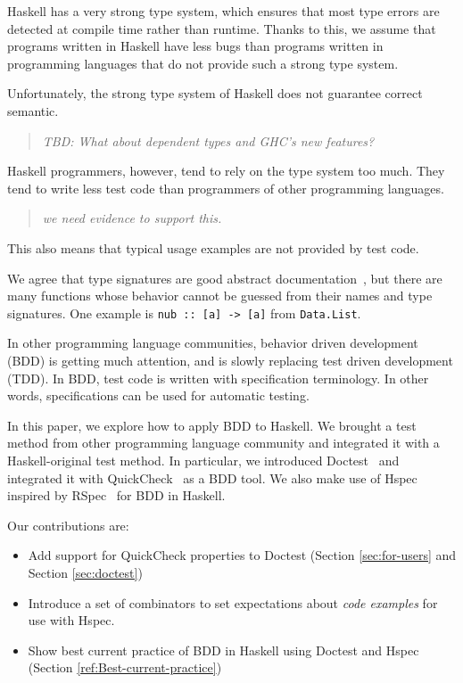 \documentclass[preprint]{sigplanconf}
\newcommand{\hspec}{Hspec}
\newcommand{\doctest}{Doctest}
\begin{document}
Haskell has a very strong type system, which ensures that most type errors are
detected at compile time rather than runtime.  Thanks to this, we assume that
programs written in Haskell have less bugs than programs written in programming
languages that do not provide such a strong type system.

Unfortunately, the strong type system of Haskell does not guarantee correct
semantic.

\begin{quote}
    \emph{TBD: What about dependent types and GHC's new features?}
\end{quote}

Haskell programmers, however, tend to rely on the type system too much.  They
tend to write less test code than programmers of other programming languages.

\begin{quote}
    \emph{we need evidence to support this.}
\end{quote}

This also means that typical usage examples are not provided by test code.

We agree that type signatures are good abstract documentation~\cite{free}, but
there are many functions whose behavior cannot be guessed from their names and
type signatures.  One example is \verb|nub :: [a] -> [a]| from {\tt Data.List}.

In other programming language communities,
behavior driven development (BDD) is getting much attention, and is
slowly replacing test driven development (TDD).
In BDD, test code is written with specification terminology.
In other words, specifications can be used for automatic testing.

In this paper, we explore how to apply BDD to Haskell.
We brought a test method from other programming language community and
integrated it with a Haskell-original test method.
In particular, we introduced \doctest{}~\cite{doctest} and
integrated it with QuickCheck~\cite{quickcheck} as a BDD tool.
We also make use of \hspec{} inspired by RSpec~\cite{rspec} for
BDD in Haskell.

Our contributions are:

\begin{itemize}
\item
    Add support for QuickCheck properties to \doctest{}
    (Section \ref{sec:for-users} and Section \ref{sec:doctest})

\item
    Introduce a set of combinators to set expectations about \emph{code
    examples} for use with \hspec{}.
\item Show best current practice of BDD in Haskell using \doctest{} and
    \hspec{} (Section \ref{ref:Best-current-practice})
\end{itemize}
\end{document}
